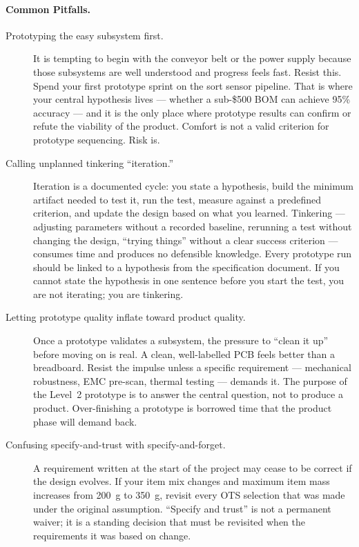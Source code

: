 \paragraph{Common Pitfalls.}
\begin{description}
  \item[Prototyping the easy subsystem first.]
        It is tempting to begin with the conveyor belt or the power supply
        because those subsystems are well understood and progress feels fast.
        Resist this.
        Spend your first prototype sprint on the sort sensor pipeline.
        That is where your central hypothesis lives --- whether a sub-\$500
        BOM can achieve 95\% accuracy --- and it is the only place where
        prototype results can confirm or refute the viability of the product.
        Comfort is not a valid criterion for prototype sequencing.
        Risk is.

  \item[Calling unplanned tinkering ``iteration.'']
        Iteration is a documented cycle: you state a hypothesis, build the
        minimum artifact needed to test it, run the test, measure against a
        predefined criterion, and update the design based on what you learned.
        Tinkering --- adjusting parameters without a recorded baseline,
        rerunning a test without changing the design, ``trying things'' without
        a clear success criterion --- consumes time and produces no defensible
        knowledge.
        Every prototype run should be linked to a hypothesis from the
        specification document.
        If you cannot state the hypothesis in one sentence before you start the
        test, you are not iterating; you are tinkering.

  \item[Letting prototype quality inflate toward product quality.]
        Once a prototype validates a subsystem, the pressure to ``clean it up''
        before moving on is real.
        A clean, well-labelled PCB feels better than a breadboard.
        Resist the impulse unless a specific requirement --- mechanical
        robustness, EMC pre-scan, thermal testing --- demands it.
        The purpose of the Level~2 prototype is to answer the central question,
        not to produce a product.
        Over-finishing a prototype is borrowed time that the product phase will
        demand back.

  \item[Confusing specify-and-trust with specify-and-forget.]
        A requirement written at the start of the project may cease to be
        correct if the design evolves.
        If your item mix changes and maximum item mass increases from 200~g to
        350~g, revisit every OTS selection that was made under the original
        assumption.
        ``Specify and trust'' is not a permanent waiver; it is a standing
        decision that must be revisited when the requirements it was based on
        change.
\end{description}


